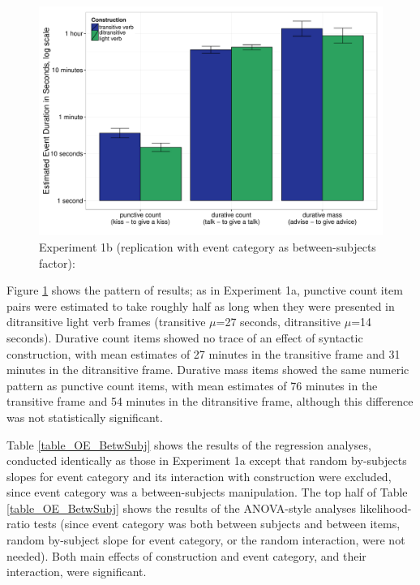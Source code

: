 \documentclass[review,12pt,authoryear]{elsarticle}
\begin{document}
\begin{figure}[ht!]
\centering
\includegraphics[width=\textwidth]{./Figures/Exp1b_AllEventsBar.pdf}
\caption{Experiment 1b (replication with event category as between-subjects factor): }
\label{fig_resOE1b}
\end{figure}

Figure \ref{fig_resOE1b} shows the pattern of results; as in Experiment 1a, punctive count item pairs were estimated to take roughly half as long when they were presented in ditransitive light verb frames (transitive  $\mu$=27 seconds, ditransitive $\mu$=14 seconds). Durative count items showed no trace of an effect of syntactic construction, with mean estimates of 27 minutes in the transitive frame and 31 minutes in the ditransitive frame. Durative mass items showed the same numeric pattern as punctive count items, with mean estimates of 76 minutes in the transitive frame and 54 minutes in the ditransitive frame, although this difference was not statistically significant.

Table \ref{table_OE_BetwSubj} shows the results of the regression analyses, conducted identically as those in Experiment 1a except that random by-subjects slopes for event category and its interaction with construction were excluded, since event category was a between-subjects manipulation. The top half of Table \ref{table_OE_BetwSubj} shows the results of the ANOVA-style analyses likelihood-ratio tests (since event category was both between subjects and between items, random by-subject slope for event category, or the random interaction, were not needed). Both main effects of construction and event category, and their interaction, were significant.
\end{document}
